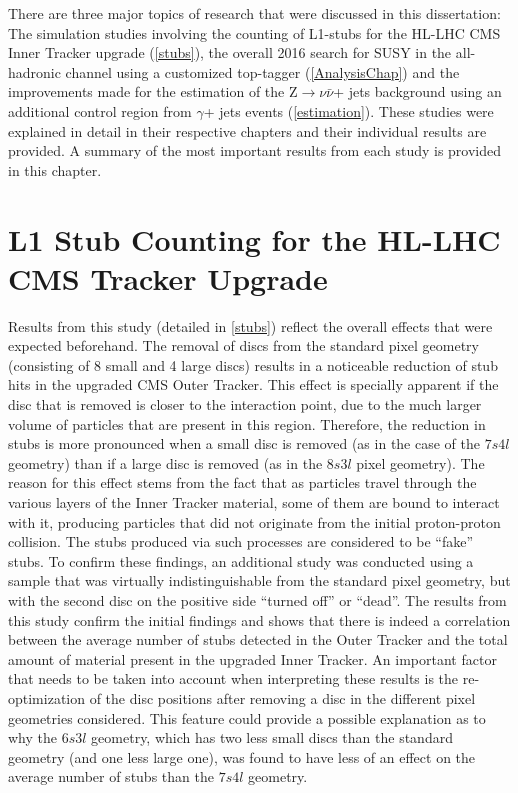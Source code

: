There are three major topics of research that were discussed in this dissertation: The simulation studies involving the counting of L1-stubs for the HL-LHC CMS Inner Tracker upgrade (\autoref{stubs}), the overall 2016 search for SUSY in the all-hadronic channel using a customized top-tagger (\autoref{AnalysisChap}) and the improvements made for the estimation of the Z$\rightarrow \nu\bar{\nu}$+ jets background using an additional control region from $\gamma$+ jets events (\autoref{estimation}). These studies were explained in detail in their respective chapters and their individual results are provided. A summary of the most important results from each study is provided in this chapter.

\section{L1 Stub Counting for the HL-LHC CMS Tracker Upgrade}

Results from this study (detailed in \autoref{stubs}) reflect the overall effects that were expected beforehand. The removal of discs from the standard pixel geometry (consisting of 8 small and 4 large discs) results in a noticeable reduction of stub hits in the upgraded CMS Outer Tracker. This effect is specially apparent if the disc that is removed is closer to the interaction point, due to the much larger volume of particles that are present in this region. Therefore, the reduction in stubs is more pronounced when a small disc is removed (as in the case of the $7s4l$ geometry) than if a large disc is removed (as in the $8s3l$ pixel geometry). The reason for this effect stems from the fact that as particles travel through the various layers of the Inner Tracker material, some of them are bound to interact with it, producing particles that did not originate from the initial proton-proton collision. The stubs produced via such processes are considered to be ``fake'' stubs. To confirm these findings, an additional study was conducted using a sample that was virtually indistinguishable from the standard pixel geometry, but with the second disc on the positive side ``turned off'' or ``dead''. The results from this study confirm the initial findings and shows that there is indeed a correlation between the average number of stubs detected in the Outer Tracker and the total amount of material present in the upgraded Inner Tracker. An important factor that needs to be taken into account when interpreting these results is the re-optimization of the disc positions after removing a disc in the different pixel geometries considered. This feature could provide a possible explanation as to why the $6s3l$ geometry, which has two less small discs than the standard geometry (and one less large one), was found to have less of an effect on the average number of stubs than the $7s4l$ geometry.

